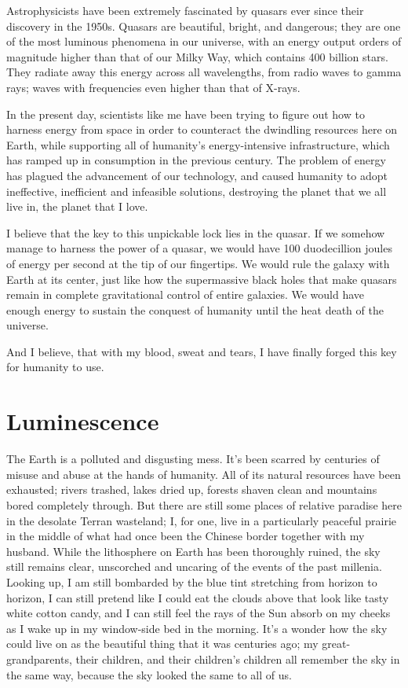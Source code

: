 \documentclass{book}
\begin{document}
			Astrophysicists have been extremely fascinated by quasars ever since their discovery in
			the 1950s. Quasars are beautiful, bright, and dangerous; they are one of the most
			luminous phenomena in our universe, with an energy output orders of magnitude higher
			than that of our Milky Way, which contains 400 billion stars. They radiate away this
			energy across all wavelengths, from radio waves to gamma rays; waves with frequencies
			even higher than that of X-rays.

			In the present day, scientists like me have been trying to figure out how to harness
			energy from space in order to counteract the dwindling resources here on Earth, while
			supporting all of humanity's energy-intensive infrastructure, which has ramped up in
			consumption in the previous century. The problem of energy has plagued the advancement
			of our technology, and caused humanity to adopt ineffective, inefficient and infeasible
			solutions, destroying the planet that we all live in, the planet that I love.

			I believe that the key to this unpickable lock lies in the quasar. If we somehow manage
			to harness the power of a quasar, we would have 100 duodecillion joules of energy per
			second at the tip of our fingertips. We would rule the galaxy with Earth at its center,
			just like how the supermassive black holes that make quasars remain in complete
			gravitational control of entire galaxies. We would have enough energy to sustain the
			conquest of humanity until the heat death of the universe.

			And I believe, that with my blood, sweat and tears, I have finally forged this key for
			humanity to use.



		\chapter{Luminescence}
			The Earth is a polluted and disgusting mess. It's been scarred by centuries of misuse
			and abuse at the hands of humanity. All of its natural resources have been exhausted;
			rivers trashed, lakes dried up, forests shaven clean and mountains bored completely
			through. But there are still some places of relative paradise here in the desolate
			Terran wasteland; I, for one, live in a particularly peaceful prairie in the middle of
			what had once been the Chinese border together with my husband. While the
			lithosphere on Earth has been thoroughly ruined, the sky still remains clear,
			unscorched and uncaring of the events of the past millenia. Looking up, I am still
			bombarded by the blue tint stretching from horizon to horizon, I can still pretend like
			I could eat the clouds above that look like tasty white cotton candy, and I can still
			feel the rays of the Sun absorb on my cheeks as I wake up in my window-side bed in the
			morning. It's a wonder how the sky could live on as the beautiful thing that it was
			centuries ago; my great-grandparents, their children, and their children's children all
			remember the sky in the same way, because the sky looked the same to all of us.
\end{document}
